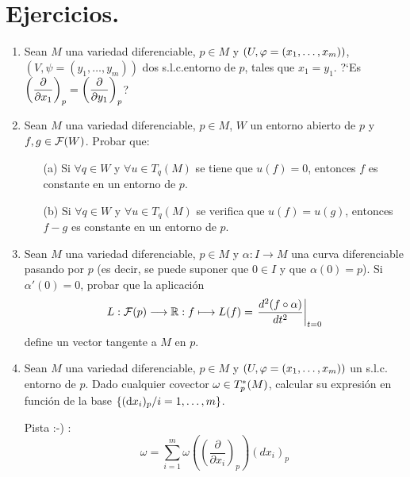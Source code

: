 \documentclass[Cursovd_portada.tex]{subfiles}
\begin{document}
\section{Ejercicios.}
\begin{enumerate}
\item Sean $M$ una variedad diferenciable, $p\in M$ y
$(U,\varphi=(x_1,\dots ,x_m))$, $(V,\psi=(y_1,\dots ,y_m))$ dos
s.l.c.entorno de $p$, tales que $x_1=y_1$. ?`Es
$\left(\displaystyle{\frac{\partial}{\partial x_1}}\right)_p=\left(\displaystyle{\frac{\partial}{\partial y_1}}\right)_p$? \item Sean $M$ una variedad
diferenciable, $p \in M$, $W$ un entorno abierto de $p$ y $f,g \in
{\cal F}(W)$. Probar que:
\begin{enumerate}
\item[(a)] Si $\forall q \in W$ y $\forall u \in T_q(M)$ se tiene
que $u(f) = 0$, entonces $f$ es constante en un entorno de $p$.
\item[(b)] Si $\forall q \in W$ y $\forall u \in T_q(M)$ se
verifica que $u(f) = u(g)$, entonces $f-g$ es constante en un
entorno de $p$.
\end{enumerate}
\item Sean $M$ una variedad diferenciable, $p \in M$ y
$\alpha:I\longrightarrow M$ una curva diferenciable pasando por
$p$ (es decir, se puede suponer que $0 \in I$ y que $\alpha(0) =
p$). Si $\alpha'(0) = 0$, probar que la aplicación $$L:{\cal
F}(p) \longrightarrow \mathbb{R}:f \longmapsto L(f) = \left.
\frac{d^2(f \circ \alpha)}{dt^2} \right |_{t=0}$$ define un vector
tangente a $M$ en $p$. \item Sean $M$ una variedad diferenciable,
$p\in M$ y $(U,\varphi=(x_1,\dots ,x_m))$ un s.l.c. entorno de $p$.
Dado cualquier covector $\omega\in T_p^*(M)$, calcular su
expresión en función de la base $\{({\rm d} x_i)_p/i=1,\dots
,m\}$.

Pista :-) :
\[ \omega = \sum_{i=1}^m \omega \left(\left(\frac{\partial}{\partial x_i}\right)_p\right) (dx_i)_p \]
\end{enumerate}
\end{document}
